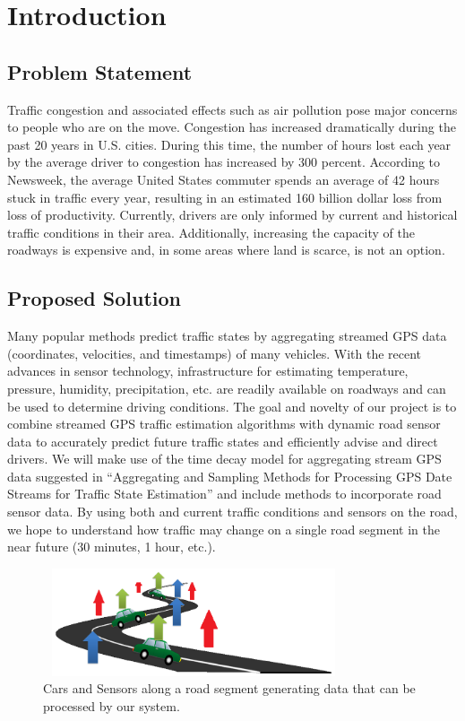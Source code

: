 \documentclass{vldb}
\begin{document}
\section{Introduction}

\subsection{Problem Statement}
Traffic congestion and associated effects such as air pollution pose major concerns to people who are on the move. Congestion has increased dramatically during the past 20 years in U.S. cities. During this time, the number of hours lost each year by the average driver to congestion has increased by 300 percent. According to Newsweek, the average United States commuter spends an average of 42 hours stuck in traffic every year, resulting in an estimated 160 billion dollar loss from loss of productivity. Currently, drivers are only informed by current and historical traffic conditions in their area. Additionally, increasing the capacity of the roadways is expensive and, in some areas where land is scarce, is not an option.

\subsection{Proposed Solution}
Many popular methods predict traffic states by aggregating streamed GPS data (coordinates, velocities, and timestamps) of many vehicles. With the recent advances in sensor technology, infrastructure for estimating temperature, pressure, humidity, precipitation, etc. are readily available on roadways and can be used to determine driving conditions. The goal and novelty of our project is to combine streamed GPS traffic estimation algorithms with dynamic road sensor data to accurately predict future traffic states and efficiently advise and direct drivers. We will make use of the time decay model for aggregating stream GPS data suggested in “Aggregating and Sampling Methods for Processing GPS Date Streams for Traffic State Estimation” and include methods to incorporate road sensor data. By using both and current traffic conditions and sensors on the road, we hope to understand how traffic may change on a single road segment in the near future (30 minutes, 1 hour, etc.). 

\begin{figure}
\centering
\includegraphics[width=3.5in,height=1.25in]{Road}
\caption{Cars and Sensors along a road segment generating data that can be processed by our system.}
\label{fig:road}
\end{figure}
\end{document}
